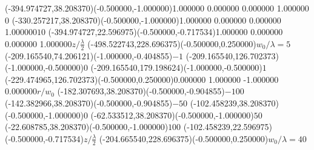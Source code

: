 \color{ASYcolor}
\fontsize{12.000000}{14.400000}\selectfont
\ASYalignT(-394.974727,38.208370)(-0.500000,-1.000000){1.000000 0.000000 0.000000 1.000000}{\vphantom{$10^4$}$0$}
\color{ASYcolor}
\fontsize{12.000000}{14.400000}\selectfont
\ASYalignT(-330.257217,38.208370)(-0.500000,-1.000000){1.000000 0.000000 0.000000 1.000000}{\vphantom{$10^4$}$10$}
\color{ASYcolor}
\fontsize{12.000000}{14.400000}\selectfont
\ASYalignT(-394.974727,22.596975)(-0.500000,-0.717534){1.000000 0.000000 0.000000 1.000000}{{\Large $z/\frac{\lambda}{2}$}}
\color{ASYcolor}
\fontsize{12.000000}{14.400000}\selectfont
\ASYalign(-498.522743,228.696375)(-0.500000,0.250000){{\LARGE $w_0/\lambda=5$}}
\color{ASYcolor}
\fontsize{12.000000}{14.400000}\selectfont
\ASYalign(-209.165540,74.206121)(-1.000000,-0.404855){\vphantom{$10^4$}$-1$}
\color{ASYcolor}
\fontsize{12.000000}{14.400000}\selectfont
\ASYalign(-209.165540,126.702373)(-1.000000,-0.500000){\vphantom{$10^4$}$0$}
\color{ASYcolor}
\fontsize{12.000000}{14.400000}\selectfont
\ASYalign(-209.165540,179.198624)(-1.000000,-0.500000){\vphantom{$10^4$}$1$}
\color{ASYcolor}
\fontsize{12.000000}{14.400000}\selectfont
\ASYalignT(-229.474965,126.702373)(-0.500000,0.250000){0.000000 1.000000 -1.000000 0.000000}{{\Large $r/w_0$}}
\color{ASYcolor}
\fontsize{12.000000}{14.400000}\selectfont
\ASYalign(-182.307693,38.208370)(-0.500000,-0.904855){\vphantom{$10^4$}$-100$}
\color{ASYcolor}
\fontsize{12.000000}{14.400000}\selectfont
\ASYalign(-142.382966,38.208370)(-0.500000,-0.904855){\vphantom{$10^4$}$-50$}
\color{ASYcolor}
\fontsize{12.000000}{14.400000}\selectfont
\ASYalign(-102.458239,38.208370)(-0.500000,-1.000000){\vphantom{$10^4$}$0$}
\color{ASYcolor}
\fontsize{12.000000}{14.400000}\selectfont
\ASYalign(-62.533512,38.208370)(-0.500000,-1.000000){\vphantom{$10^4$}$50$}
\color{ASYcolor}
\fontsize{12.000000}{14.400000}\selectfont
\ASYalign(-22.608785,38.208370)(-0.500000,-1.000000){\vphantom{$10^4$}$100$}
\color{ASYcolor}
\fontsize{12.000000}{14.400000}\selectfont
\ASYalign(-102.458239,22.596975)(-0.500000,-0.717534){{\Large $z/\frac{\lambda}{2}$}}
\color{ASYcolor}
\fontsize{12.000000}{14.400000}\selectfont
\ASYalign(-204.665540,228.696375)(-0.500000,0.250000){{\LARGE $w_0/\lambda=40$}}
